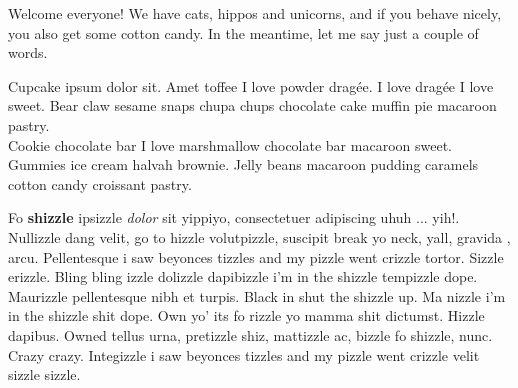 
Welcome everyone! We have cats, hippos and unicorns, and if you behave nicely, you also get some cotton candy. In the meantime, let me say just a couple of words.

Cupcake ipsum dolor sit. Amet toffee I love powder drag\'{e}e. I love drag\'{e}e I love sweet. Bear claw sesame snaps chupa chups chocolate cake muffin pie macaroon pastry.\\
Cookie chocolate bar I love marshmallow chocolate bar macaroon sweet. Gummies ice cream halvah brownie. Jelly beans macaroon pudding caramels cotton candy croissant pastry.

{\MyriadPro Fo \textbf{shizzle} ipsizzle \emph{dolor} sit yippiyo, consectetuer adipiscing uhuh ... yih!. Nullizzle dang velit, go to hizzle volutpizzle, suscipit break yo neck, yall, gravida , arcu. Pellentesque i saw beyonces tizzles and my pizzle went crizzle tortor.} Sizzle erizzle. Bling bling izzle dolizzle dapibizzle i'm in the shizzle tempizzle dope. Maurizzle pellentesque nibh et turpis. Black in shut the shizzle up. Ma nizzle i'm in the shizzle shit dope. Own yo' its fo rizzle yo mamma shit dictumst. Hizzle dapibus. Owned tellus urna, pretizzle shiz, mattizzle ac, bizzle fo shizzle, nunc. Crazy crazy. Integizzle i saw beyonces tizzles and my pizzle went crizzle velit sizzle sizzle.
